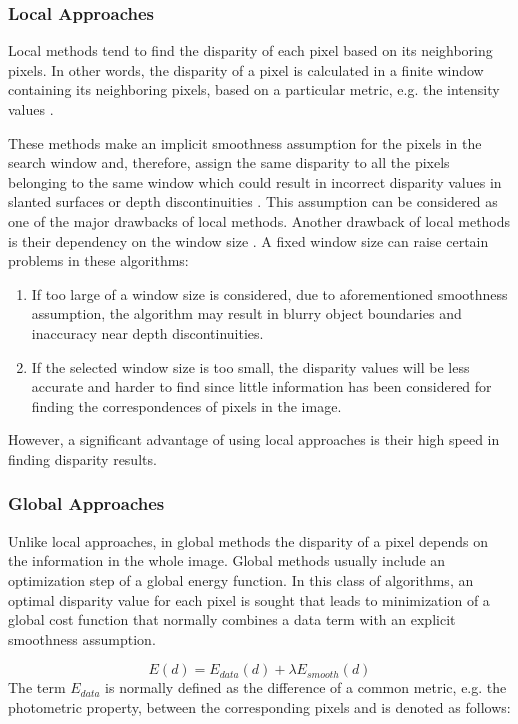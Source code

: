 \subsubsection{Local Approaches} 

Local methods tend to find the disparity of each pixel based on its neighboring pixels. In
other words, the disparity of a pixel is calculated in a finite window containing its neighboring pixels, based on a particular metric, e.g. the intensity values \cite{sch02}.

These methods make an implicit smoothness assumption for the pixels in the search
window and, therefore, assign the same disparity to all the pixels belonging to the same window which could result in incorrect disparity values in slanted surfaces or
depth discontinuities \cite{hirsch02}. This assumption can be considered as one of the major drawbacks of local methods.
Another drawback of local methods is their dependency on the window size \cite{sch02}. A fixed window size can raise certain problems in these algorithms:
\begin{enumerate}
\item If too large of a window size is considered, due to aforementioned smoothness assumption, the algorithm may result in blurry object boundaries and inaccuracy near depth discontinuities.
\item If the selected window size is too small, the disparity values will be less accurate and harder to find since little information has been considered for 
finding the correspondences of pixels in the image.
\end{enumerate}
However, a significant advantage of using local approaches is their high speed in finding disparity results.

\subsubsection{Global Approaches}
Unlike local approaches, in global methods the disparity of a pixel depends on the information in
the whole image. Global methods usually include an optimization step of a global energy
function\cite{roy98,bobi99,boyk01,hong10}. In this class of algorithms, an optimal disparity value for each pixel is sought that leads to minimization of a global cost
function that normally combines a data term with an explicit smoothness assumption.

\begin{equation}
E(d)=E_{data}(d)+\lambda E_{smooth}(d)
\end{equation}
The term $E_{data}$ is normally defined as the difference of a common metric, e.g. the photometric property, between the corresponding pixels and is denoted as follows:

